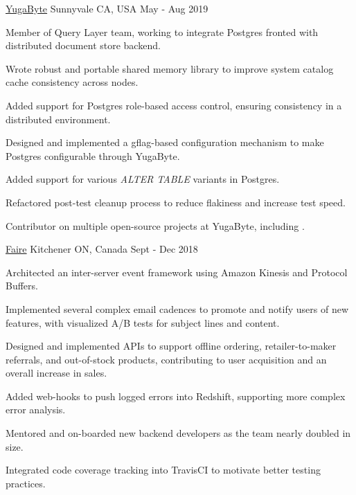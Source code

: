 
\begin{cventries}

  {\href{https://www.yugabyte.com}{YugaByte}} {Sunnyvale CA, USA} {May - Aug
    2019} {
    \begin{cvitems}
    \item Member of Query Layer team, working to integrate Postgres fronted with
      distributed document store backend.
    \item Wrote robust and portable shared memory library to improve system
      catalog cache consistency across nodes.
    \item Added support for Postgres role-based access control, ensuring
      consistency in a distributed environment.
    \item Designed and implemented a gflag-based configuration mechanism to
      make Postgres configurable through YugaByte.
    \item Added support for various \textit{ALTER TABLE} variants in Postgres.
    \item Refactored post-test cleanup process to reduce flakiness and increase
      test speed.
    \item Contributor on multiple open-source projects at YugaByte, including
      \thinspace
      \href{https://github.com/YugaByte/yugabyte-db/commits?author=srhickma}{\color[HTML]{3090C7}{yugabyte-db
          \faExternalLink}}.
    \end{cvitems}
  }

  {\href{https://www.faire.com}{Faire}} {Kitchener ON, Canada} {Sept - Dec 2018}
  {
    \begin{cvitems}
    \item Architected an inter-server event framework using Amazon Kinesis and
      Protocol Buffers.
    \item Implemented several complex email cadences to promote and notify users
      of new features, with visualized A/B tests for subject lines and content.
    \item Designed and implemented APIs to support offline ordering,
      retailer-to-maker referrals, and out-of-stock products, contributing to
      user acquisition and an overall increase in sales.
    \item Added web-hooks to push logged errors into Redshift, supporting more
      complex error analysis.
    \item Mentored and on-boarded new backend developers as the team nearly
      doubled in size.
    \item Integrated code coverage tracking into TravisCI to motivate better
      testing practices.
    \end{cvitems}
  }
    

\end{cventries}
